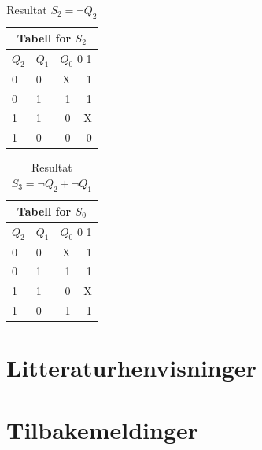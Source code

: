 \documentclass[12pt,norsk,a4paper]{article}
\begin{document}
\begin{table}[H]
\begin{center}
\begin{tabular}{|l|l|r|r|} \hline
\multicolumn{4}{|c|}{Tabell for $S_2$} \\ \hline
$Q_2$ & $Q_1$ & \multicolumn{2}{|r|}{$Q_0$ \hspace{20 mm} 0 \hspace{2 mm} 1} \\ \hline
0 & 0 & \hspace{27 mm} X \cellcolor[gray]{0.8} & \cellcolor[gray]{0.8} 1 \\ \hline 
0 & 1 & 1 \cellcolor[gray]{0.8} & 1 \cellcolor[gray]{0.8} \\ \hline
1 & 1 & 0 & X \\ \hline
1 & 0 & 0 & 0 \\ \hline
\end{tabular}
\end{center}
\caption{Resultat $S_2=\neg Q_2$}
\end{table}

\begin{table}[H]
\begin{center}
\begin{tabular}{|l|l|r|r|} \hline
\multicolumn{4}{|c|}{Tabell for $S_0$} \\ \hline
$Q_2$ & $Q_1$ & \multicolumn{2}{|r|}{$Q_0$ \hspace{20 mm} 0 \hspace{2 mm} 1} \\ \hline
0 & 0 & \hspace{27 mm} X \cellcolor[gray]{0.8} & \cellcolor[gray]{0.8} 1 \\ \hline 
0 & 1 & 1 \cellcolor[gray]{0.8} & 1 \cellcolor[gray]{0.8} \\ \hline
1 & 1 & 0 & X \\ \hline
1 & 0 & 1 \cellcolor[gray]{0.8} & 1 \cellcolor[gray]{0.8} \\ \hline
\end{tabular}
\end{center}
\caption{Resultat $S_3=\neg Q_2 + \neg Q_1$}
\end{table}

\clearpage

\section{Litteraturhenvisninger}
\clearpage

\section{Tilbakemeldinger}
\clearpage
\end{document}
